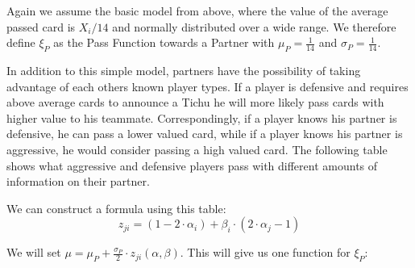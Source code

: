 Again we assume the basic model from above, where the value of the average passed card is $X_i/14$ and normally distributed over a wide range. We therefore define $\xi_P$ as the Pass Function towards a Partner with $\mu_P =\frac{1}{14}$ and $\sigma_P = \frac{1}{14}$.


In addition to this simple model, partners have the possibility of taking advantage of each others known player types. If a player is defensive and requires above average cards to announce a Tichu he will more likely pass cards with higher value to his teammate. Correspondingly, if a player knows his partner is defensive, he can pass a lower valued card, while if a player knows his partner is aggressive, he would consider passing a high valued card. The following table shows what aggressive and defensive players pass with different amounts of information on their partner. \\
\begin{table}[h]
\caption{Table 2} \bigskip
\label{tab:my-table}
\end{table}
We can construct a formula using this table: 
\begin{equation*}
z_{ji} = (1 - 2\cdot\alpha_i) + \beta_i \cdot (2\cdot\alpha_j - 1)
\end{equation*}

We will set $\mu = \mu_P + \frac{\sigma_P}{2} \cdot z_{ji}(\alpha, \beta)$. This will give us one function for $\xi_P$:

